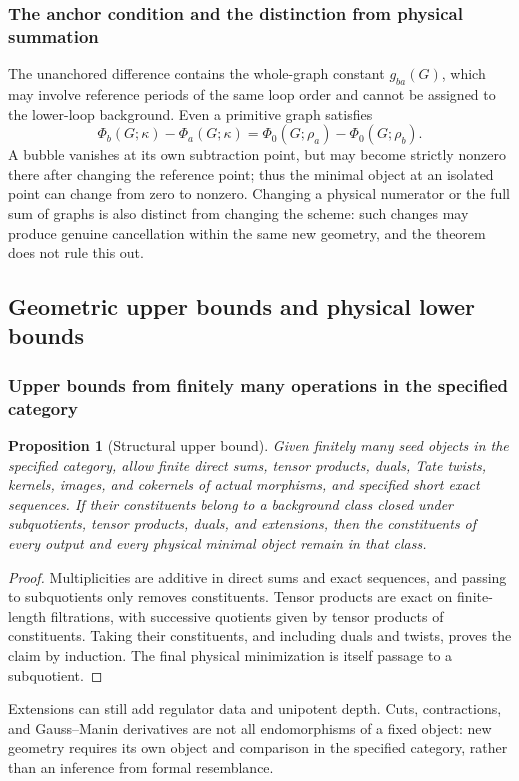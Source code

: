 \documentclass[11pt,a4paper,oneside]{article}
\theoremstyle{plain}
\newtheorem{proposition}[theorem]{Proposition}
\theoremstyle{definition}
\theoremstyle{remark}
\numberwithin{equation}{section}
\begin{document}
\subsubsection{The anchor condition and the distinction from physical summation}
The unanchored difference contains the whole-graph constant $g_{ba}(G)$,
which may involve reference periods of the same loop order and cannot be assigned to the lower-loop background.
Even a primitive graph satisfies
\[
 \Phi_b(G;\kappa)-\Phi_a(G;\kappa)
 =\Phi_0(G;\rho_a)-\Phi_0(G;\rho_b).
\]
A bubble vanishes at its own subtraction point, but may become strictly nonzero there after changing the reference point;
thus the minimal object at an isolated point can change from zero to nonzero.
Changing a physical numerator or the full sum of graphs is also distinct from changing the scheme:
such changes may produce genuine cancellation within the same new geometry, and the theorem does not rule this out.


\subsection{Geometric upper bounds and physical lower bounds}
\subsubsection{Upper bounds from finitely many operations in the specified category}
\begin{proposition}[Structural upper bound]\label{unified:prop:upper}
Given finitely many seed objects in the specified category, allow finite direct sums, tensor products, duals, Tate twists,
kernels, images, and cokernels of actual morphisms, and specified short exact sequences.
If their constituents belong to a background class closed under subquotients, tensor products, duals, and extensions,
then the constituents of every output and every physical minimal object remain in that class.
\end{proposition}
\begin{proof}
Multiplicities are additive in direct sums and exact sequences, and passing to subquotients only removes constituents.
Tensor products are exact on finite-length filtrations, with successive quotients given by tensor products of constituents.
Taking their constituents, and including duals and twists, proves the claim by induction.
The final physical minimization is itself passage to a subquotient.
\end{proof}
Extensions can still add regulator data and unipotent depth.
Cuts, contractions, and Gauss--Manin derivatives are not all endomorphisms of a fixed object:
new geometry requires its own object and comparison in the specified category, rather than an inference from formal resemblance.
\end{document}
